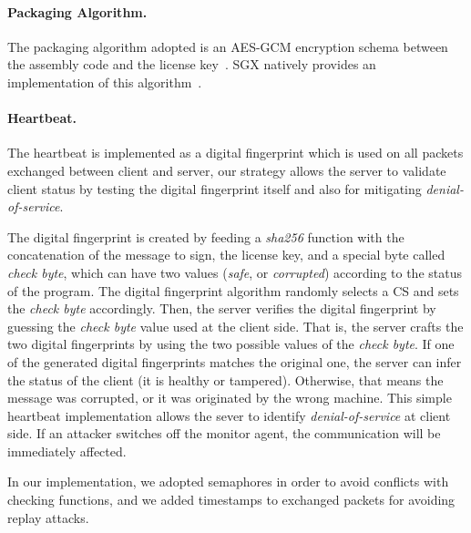 \paragraph{Packaging Algorithm.}
The packaging algorithm adopted is an AES-GCM encryption 
schema between the assembly code and the license key~\citep{zhou2007efficient}.
SGX natively provides an implementation of this 
algorithm~\citep{rijndael128GCM}.

\paragraph{Heartbeat.}
The heartbeat is implemented as a digital fingerprint which is used on all 
packets exchanged between
client and server, our strategy allows the server to validate client status by 
testing the
digital fingerprint itself and also for mitigating \emph{denial-of-service}.

The digital fingerprint is created by feeding a \emph{sha256} function with the
concatenation of the message to sign, the license key, and a special byte called
\emph{check byte}, which can have two values (\emph{safe}, or \emph{corrupted})
according to the status of the program.
The digital fingerprint algorithm randomly selects a CS and sets the 
\emph{check byte}
accordingly.
Then, the server verifies the digital fingerprint by guessing the \emph{check 
byte} value used at the client side.
That is, the server crafts the two digital fingerprints by using the two 
possible values of the \emph{check byte}.
If one of the generated digital fingerprints matches the original one, the 
server can infer the status of the client (\ie it is healthy or tampered).
Otherwise, that means the message was corrupted, or it was originated by the 
wrong machine.
This simple heartbeat implementation allows the sever to 
identify \emph{denial-of-service} at client side. If an
attacker switches off the monitor agent,
the communication will be immediately affected.


In our implementation, we adopted semaphores in order to avoid conflicts
with checking functions, and we added timestamps to exchanged packets for 
avoiding replay attacks.

